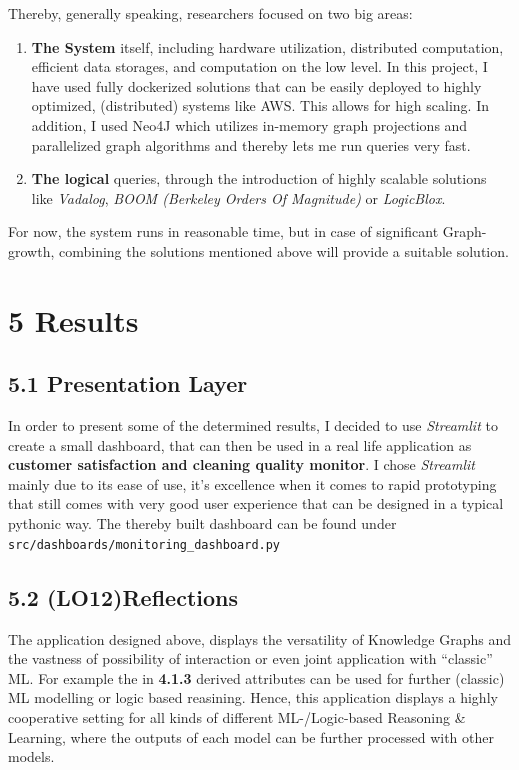 \documentclass[
]{article}
\begin{document}
Thereby, generally speaking, researchers focused on two big areas: 
\begin{enumerate}
  \item \textbf{The System} itself, including hardware utilization, distributed computation, efficient data storages, and computation on the low level. In this project, I have used fully dockerized solutions that can be easily deployed to highly optimized, (distributed) systems like AWS. This allows for high scaling. In addition, I used Neo4J which utilizes in-memory graph projections and parallelized graph algorithms and thereby lets me run queries very fast.
  \item \textbf{The logical} queries, through the introduction of highly scalable solutions like \emph{Vadalog}, \emph{BOOM (Berkeley Orders Of Magnitude)} or \emph{LogicBlox}.
\end{enumerate}

For now, the system runs in reasonable time, but in case of significant
Graph-growth, combining the solutions mentioned above will provide a
suitable solution.

\pagebreak

\section{5 Results}\label{results-1}

\subsection{5.1 Presentation Layer}\label{presentation-layer}

In order to present some of the determined results, I decided to use
\emph{Streamlit} to create a small dashboard, that can then be used in a
real life application as \textbf{customer satisfaction and cleaning
quality monitor}. I chose \emph{Streamlit} mainly due to its ease of use,
it's excellence when it comes to rapid prototyping that still comes with
very good user experience that can be designed in a typical pythonic
way. The thereby built dashboard can be found under
\texttt{src/dashboards/monitoring\_dashboard.py}

\subsection{5.2 (LO12)Reflections}\label{reflections}

The application designed above, displays the versatility of Knowledge
Graphs and the vastness of possibility of interaction or even joint
application with ``classic'' ML. For example the in \textbf{4.1.3}
derived attributes can be used for further (classic) ML modelling or
logic based reasining. Hence, this application displays a highly
cooperative setting for all kinds of different ML-/Logic-based Reasoning
\& Learning, where the outputs of each model can be further processed
with other models.
\end{document}
